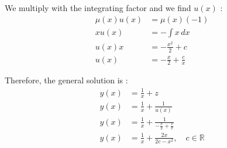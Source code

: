 \documentclass{article}
\begin{document}
We multiply with the integrating factor and we find $u(x)$ :
\begin{align*}
    μ(x)u(x) &= μ(x)(-1) \\
    xu(x) &= -\int{x}\,dx \\
    u(x)x &= -\frac{x^2}{2}+c \\
    u(x) &= -\frac{x}{2}+\frac{c}{x}
\end{align*}

Therefore, the general solution is :
\begin{align*}
    y(x) &= \frac{1}{x}+z \\
    y(x) &= \frac{1}{x}+\frac{1}{u(x)} \\
    y(x) &= \frac{1}{x}+\frac{1}{-\frac{x}{2}+\frac{c}{x}} \\ 
    y(x) &= \frac{1}{x}+\frac{2x}{2c-x^2} ,\quad c \in \mathbb{R}
\end{align*}
\end{document}
